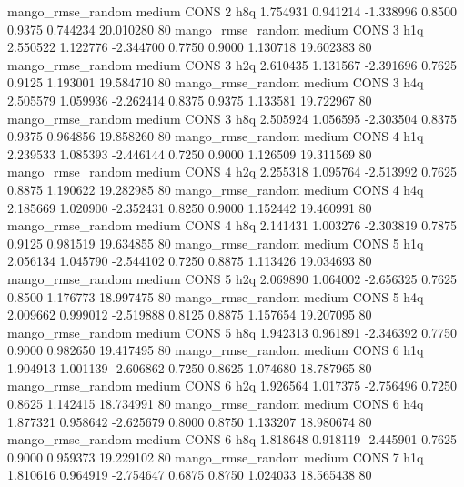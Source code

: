 mango_rmse_random     medium     CONS                 2                  h8q  1.754931 0.941214 -1.338996 0.8500 0.9375  0.744234   20.010280 80
mango_rmse_random     medium     CONS                 3                  h1q  2.550522 1.122776 -2.344700 0.7750 0.9000  1.130718   19.602383 80
mango_rmse_random     medium     CONS                 3                  h2q  2.610435 1.131567 -2.391696 0.7625 0.9125  1.193001   19.584710 80
mango_rmse_random     medium     CONS                 3                  h4q  2.505579 1.059936 -2.262414 0.8375 0.9375  1.133581   19.722967 80
mango_rmse_random     medium     CONS                 3                  h8q  2.505924 1.056595 -2.303504 0.8375 0.9375  0.964856   19.858260 80
mango_rmse_random     medium     CONS                 4                  h1q  2.239533 1.085393 -2.446144 0.7250 0.9000  1.126509   19.311569 80
mango_rmse_random     medium     CONS                 4                  h2q  2.255318 1.095764 -2.513992 0.7625 0.8875  1.190622   19.282985 80
mango_rmse_random     medium     CONS                 4                  h4q  2.185669 1.020900 -2.352431 0.8250 0.9000  1.152442   19.460991 80
mango_rmse_random     medium     CONS                 4                  h8q  2.141431 1.003276 -2.303819 0.7875 0.9125  0.981519   19.634855 80
mango_rmse_random     medium     CONS                 5                  h1q  2.056134 1.045790 -2.544102 0.7250 0.8875  1.113426   19.034693 80
mango_rmse_random     medium     CONS                 5                  h2q  2.069890 1.064002 -2.656325 0.7625 0.8500  1.176773   18.997475 80
mango_rmse_random     medium     CONS                 5                  h4q  2.009662 0.999012 -2.519888 0.8125 0.8875  1.157654   19.207095 80
mango_rmse_random     medium     CONS                 5                  h8q  1.942313 0.961891 -2.346392 0.7750 0.9000  0.982650   19.417495 80
mango_rmse_random     medium     CONS                 6                  h1q  1.904913 1.001139 -2.606862 0.7250 0.8625  1.074680   18.787965 80
mango_rmse_random     medium     CONS                 6                  h2q  1.926564 1.017375 -2.756496 0.7250 0.8625  1.142415   18.734991 80
mango_rmse_random     medium     CONS                 6                  h4q  1.877321 0.958642 -2.625679 0.8000 0.8750  1.133207   18.980674 80
mango_rmse_random     medium     CONS                 6                  h8q  1.818648 0.918119 -2.445901 0.7625 0.9000  0.959373   19.229102 80
mango_rmse_random     medium     CONS                 7                  h1q  1.810616 0.964919 -2.754647 0.6875 0.8750  1.024033   18.565438 80
